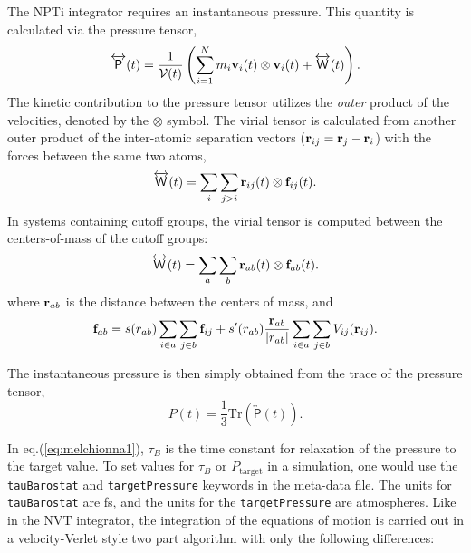 \documentclass[letterpaper]{report}
\begin{document}
The NPTi integrator requires an instantaneous pressure. This quantity
is calculated via the pressure tensor,
\begin{equation}
\overleftrightarrow{\mathsf{P}}(t) = \frac{1}{\mathcal{V}(t)} \left(
\sum_{i=1}^{N} m_i {\bf v}_i(t) \otimes {\bf v}_i(t) +
\overleftrightarrow{\mathsf{W}}(t) \right).
\end{equation}
The kinetic contribution to the pressure tensor utilizes the {\it
outer} product of the velocities, denoted by the $\otimes$ symbol.  The
virial tensor is calculated from another outer product of the
inter-atomic separation vectors (${\bf r}_{ij} = {\bf r}_j - {\bf
r}_i$) with the forces between the same two atoms,
\begin{equation}
\overleftrightarrow{\mathsf{W}}(t) = \sum_{i} \sum_{j>i} {\bf r}_{ij}(t)
\otimes {\bf f}_{ij}(t).
\end{equation}
In systems containing cutoff groups, the virial tensor is computed
between the centers-of-mass of the cutoff groups:
\begin{equation}
\overleftrightarrow{\mathsf{W}}(t) = \sum_{a} \sum_{b} {\bf r}_{ab}(t)
\otimes {\bf f}_{ab}(t).
\end{equation}
where ${\bf r}_{ab}$ is the distance between the centers of mass, and 
\begin{equation}
{\bf f}_{ab} = s(r_{ab}) \sum_{i \in a} \sum_{j \in b} {\bf f}_{ij} +
s^{\prime}(r_{ab}) \frac{{\bf r}_{ab}}{|r_{ab}|} \sum_{i \in a} \sum_{j
\in b} V_{ij}({\bf r}_{ij}).
\end{equation}

The instantaneous pressure is then simply obtained from the trace of
the pressure tensor,
\begin{equation}
P(t) = \frac{1}{3} \mathrm{Tr} \left( \overleftrightarrow{\mathsf{P}}(t)
\right).
\end{equation}

In eq.(\ref{eq:melchionna1}), $\tau_B$ is the time constant for
relaxation of the pressure to the target value.  To set values for
$\tau_B$ or $P_{\mathrm{target}}$ in a simulation, one would use the
{\tt tauBarostat} and {\tt targetPressure} keywords in the meta-data
file.  The units for {\tt tauBarostat} are fs, and the units for the
{\tt targetPressure} are atmospheres.  Like in the NVT integrator, the
integration of the equations of motion is carried out in a
velocity-Verlet style two part algorithm with only the following
differences:
\end{document}
